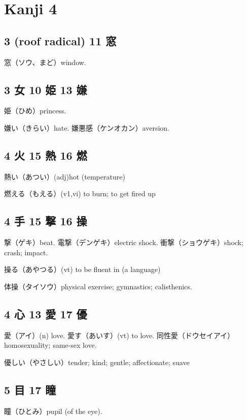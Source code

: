 \chapter{Kanji 4}

\section{3 (roof radical) 11 窓}

窓（ソウ、まど）window.

\section{3 女 10 姫 13 嫌}

姫（ひめ）princess.

嫌い（きらい）hate.
嫌悪感（ケンオカン）aversion.

\section{4 火 15 熱 16 燃}

熱い（あつい）(adj)hot (temperature)

燃える（もえる）(v1,vi) to burn; to get fired up

\section{4 手 15 撃 16 操}

撃（ゲキ）beat.
電撃（デンゲキ）electric shock.
衝撃（ショウゲキ）shock; crash; impact.

操る（あやつる）(vt) to be fluent in (a language)

体操（タイソウ）physical exercise; gymnastics; calisthenics.

\section{4 心 13 愛 17 優}

愛（アイ）(n) love.
愛す（あいす）(vt) to love.
同性愛（ドウセイアイ）homosexuality; same-sex love.

優しい（やさしい）tender; kind; gentle; affectionate; suave

\section{5 目 17 瞳}

瞳（ひとみ）pupil (of the eye).

